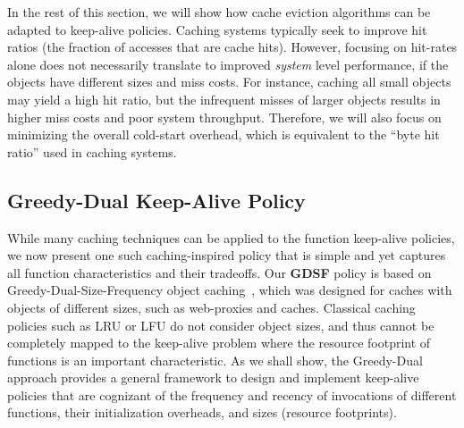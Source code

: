 In the rest of this section, we will show how cache eviction algorithms can be adapted to keep-alive policies.
Caching systems typically seek to improve hit ratios (the fraction of accesses that are cache hits).
However, focusing on hit-rates alone does not necessarily translate to improved \emph{system} level performance, if the objects have different sizes and miss costs.
For instance, caching all small objects may yield a high hit ratio, but the infrequent misses of larger objects results in higher miss costs and poor system throughput. 
Therefore, we will also focus on minimizing the overall cold-start overhead, which is equivalent to the ``byte hit ratio'' used in caching systems.







\subsection{Greedy-Dual Keep-Alive Policy}
\label{subsec:gdsf}

While many caching techniques can be applied to the function keep-alive policies, we now present one such caching-inspired policy that is simple and yet captures all function characteristics and their tradeoffs.
Our \textbf{GDSF} policy is based on Greedy-Dual-Size-Frequency object caching~\cite{gdsf}, which was designed for caches with objects of  different sizes, such as web-proxies and caches. 
Classical caching policies such as LRU or LFU do not consider object sizes, and thus cannot be completely mapped to the keep-alive problem where the resource footprint of functions is an important characteristic. 
As we shall show, the Greedy-Dual approach provides a general framework to design and implement keep-alive policies that are cognizant of the  frequency and recency of invocations of different functions, their initialization overheads, and sizes (resource footprints). 


